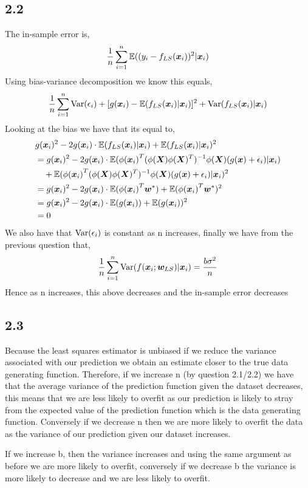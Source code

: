 \subsection*{2.2}
The in-sample error is,
\begin{equation}
    \frac{1}{n} \sum_{i=1}^{n} {\mathbb{E}}((y_{i} - f_{LS}({\bm{x}_{i}}))^{2} | {\bm{x}_{i}})
\end{equation}
Using bias-variance decomposition we know this equals,
\begin{equation}
    \frac{1}{n} \sum_{i=1}^{n} {\text{Var}}(\epsilon_{i}) + [g({\bm{x}_{i}}) - {\mathbb{E}}(f_{LS}({\bm{x}_{i}}) | {\bm{x}_{i}})]^{2} + {\text{Var}}(f_{LS}({\bm{x}_{i}}) | {\bm{x}_{i}})
\end{equation} 
Looking at the bias we have that its equal to,
\begin{align}
    &{} g({\bm{x}_{i}})^{2} - 2g({\bm{x}_{i}}) \cdot {\mathbb{E}}(f_{LS}({\bm{x}_{i}}) | {\bm{x}_{i}}) + {\mathbb{E}}(f_{LS}({\bm{x}_{i}})|{\bm{x}_{i}})^{2} \\
    &= g({\bm{x}_{i}})^{2} -2g({\bm{x}_{i}}) \cdot {\mathbb{E}}({\phi(\bm{x}_{i})}^{T} ({\phi(\bm{X})} {\phi(\bm{X})^{T}})^{-1} {\phi(\bm{X})} (g({\bm{x}}) + \epsilon_{i}) | {\bm{x}_{i}})  \\
    & \quad + {\mathbb{E}}({\phi(\bm{x}_{i})}^{T} ({\phi(\bm{X})} {\phi(\bm{X})^{T}})^{-1} {\phi(\bm{X})} (g({\bm{x}}) + \epsilon_{i}) | {\bm{x}_{i}})^{2} \\
    &= g({\bm{x}_{i}})^{2} -2g({\bm{x}_{i}}) \cdot {\mathbb{E}}({\phi(\bm{x}_{i})}^{T} {\bm{w}^{*}}) + {\mathbb{E}}({\phi(\bm{x}_{i})}^{T} {\bm{w}^{*}})^{2} \\
    &= g({\bm{x}_{i}})^{2} - 2g({\bm{x}_{i}}) \cdot {\mathbb{E}}(g({\bm{x}_{i}})) + {\mathbb{E}}(g({\bm{x}_{i}}))^{2} \\
    &= 0
\end{align}
We also have that ${\text{Var}}(\epsilon_{i})$ is constant as n increases, finally we have from the previous question that,
\begin{equation}
    \frac{1}{n} \sum_{i=1}^{n} {\text{Var}}(f({\bm{x}_{i}};{\bm{w}_{LS}})| {\bm{x}_{i}}) = \frac{b \sigma^{2}}{n}
\end{equation}
Hence as n increases, this above decreases and the in-sample error decreases 

\subsection*{2.3}
Because the least squares estimator is unbiased if we reduce the variance associated with our prediction we obtain an estimate closer to the true data generating function. Therefore, if we increase n (by question 2.1/2.2) we have that the average variance of the prediction function given the dataset decreases, this means that we are less likely to overfit as our prediction is likely to stray from the expected value of the prediction function which is the data generating function. Conversely if we decrease n then we are more likely to overfit the data as the variance of our prediction given our dataset increases.

If we increase b, then the variance increases and using the same argument as before we are more likely to overfit, conversely if we decrease b the variance is more likely to decrease and we are less likely to overfit. 